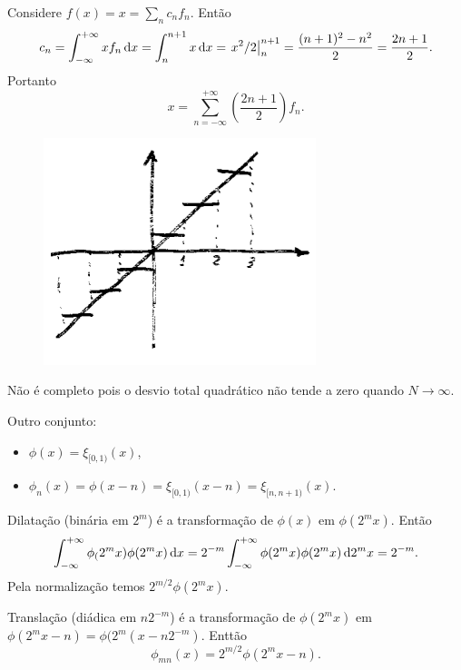 \begin{exem}
  Considere $f(x) = x = \sum_{n} c_n f_n$. Então
  \begin{dmath*}
    c_n = \int_{-\infty}^{+\infty} x f_n \vi{x}
    = \int_{n}^{n + 1} x \vi{x}
    = \left. x^2 / 2 \right|_{n}^{n + 1}
    = \frac{(n + 1)^2 - n^2}{2}
    = \frac{2 n + 1}{2}.
  \end{dmath*}
  Portanto
  \begin{dmath}
    x = \sum_{n = -\infty}^{+\infty} \left( \frac{2 n + 1}{2} \right) f_n.
  \end{dmath}
  \begin{figure}[htb]
    \centering
    \includegraphics{figuras/07-0}
  \end{figure}
  Não é completo pois o desvio total quadrático não tende a zero quando $N \to
  \infty$.
\end{exem}

Outro conjunto:
\begin{itemize}
  \item $\phi(x) = \xi_{[0,1)}(x)$,
  \item $\phi_n(x) = \phi(x - n) = \xi_{[0,1)}(x - n) = \xi_{[n, n + 1)}(x)$.
\end{itemize}

Dilatação (binária em $2^m$) é a transformação de $\phi(x)$ em $\phi(2^m x)$.
Então
\begin{dmath*}
  \int_{-\infty}^{+\infty} \phi_(2^m x) \phi(2^m x) \vi{x} = 2^{-m}
  \int_{-\infty}^{+\infty} \phi(2^m x) \phi(2^m x) \vi{2^m x}
  = 2^{-m}.
\end{dmath*}
Pela normalização temos $2^{m / 2} \phi(2^m x)$.

Translação (diádica em $n 2^{-m}$) é a transformação de $\phi(2^m x)$ em
$\phi(2^m x - n) = \phi(2^m (x - n 2^{-m})$. Enttão
\begin{dmath*}
  \phi_{mn}(x) = 2^{m / 2} \phi(2^m x - n).
\end{dmath*}

